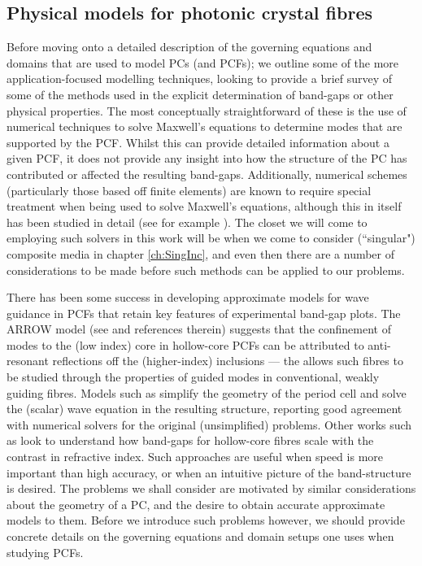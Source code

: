 \subsection{Physical models for photonic crystal fibres} \label{ssec:ExistingPCFModels}
Before moving onto a detailed description of the governing equations and domains that are used to model PCs (and PCFs); we outline some of the more application-focused modelling techniques, looking to provide a brief survey of some of the methods used in the explicit determination of band-gaps or other physical properties.
The most conceptually straightforward of these is the use of numerical techniques to solve Maxwell's equations to determine modes that are supported by the PCF.
Whilst this can provide detailed information about a given PCF, it does not provide any insight into how the structure of the PC has contributed or affected the resulting band-gaps.
Additionally, numerical schemes (particularly those based off finite elements) are known to require special treatment when being used to solve Maxwell's equations, although this in itself has been studied in detail (see for example \cite{monk2003finite}).
The closet we will come to employing such solvers in this work will be when we come to consider (``singular") composite media in chapter \ref{ch:SingInc}, and even then there are a number of considerations to be made before such methods can be applied to our problems.

There has been some success in developing approximate models for wave guidance in PCFs that retain key features of experimental band-gap plots.
The ARROW model (see \cite{laegsgaard2004gap, litchinitser2004application} and references therein) suggests that the confinement of modes to the (low index) core in hollow-core PCFs can be attributed to anti-resonant reflections off the (higher-index) inclusions --- the allows such fibres to be studied through the properties of guided modes in conventional, weakly guiding fibres.
Models such as \cite{birks2006approximate} simplify the geometry of the period cell and solve the (scalar) wave equation in the resulting structure, reporting good agreement with numerical solvers for the original (unsimplified) problems.
Other works such as \cite{birks2004scaling} look to understand how band-gaps for hollow-core fibres scale with the contrast in refractive index.
Such approaches are useful when speed is more important than high accuracy, or when an intuitive picture of the band-structure is desired.
The problems we shall consider are motivated by similar considerations about the geometry of a PC, and the desire to obtain accurate approximate models to them.
Before we introduce such problems however, we should provide concrete details on the governing equations and domain setups one uses when studying PCFs.